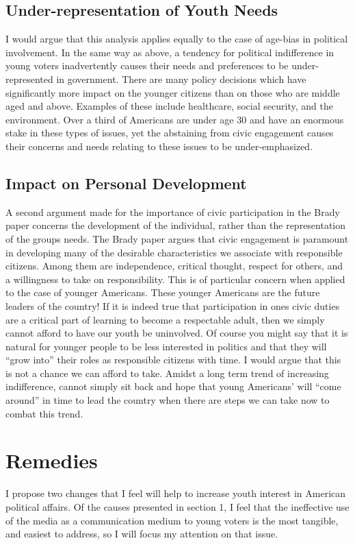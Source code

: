 \documentclass[12pt,letterpaper]{article}
\begin{document}
\subsection{Under-representation of Youth Needs}
I would argue that this analysis applies equally to the case of
age-bias in political involvement.  In the same way as above, a
tendency for political indifference in young voters inadvertently
causes their needs and preferences to be under-represented in
government.  There are many policy decisions which have significantly
more impact on the younger citizens than on those who are middle aged
and above.  Examples of these include healthcare, social security, and
the environment. Over a third of Americans are under age 30 and have
an enormous stake in these types of issues, yet the abstaining from
civic engagement causes their concerns and needs relating to these
issues to be under-emphasized.

\subsection{Impact on Personal Development} A second argument made for
the importance of civic participation in the Brady paper concerns the
development of the individual, rather than the representation of the
groups needs. The Brady paper argues that civic engagement is
paramount in developing many of the desirable characteristics we
associate with responsible citizens.  Among them are independence,
critical thought, respect for others, and a willingness to take
on responsibility. This is of particular concern when applied to the
case of younger Americans. These younger Americans are the future
leaders of the country! If it is indeed true that participation in
ones civic duties are a critical part of learning to become a
respectable adult, then we simply cannot afford to have our youth be
uninvolved.  Of course you might say that it is natural for younger
people to be less interested in politics and that they will ``grow
into'' their roles as responsible citizens with time.  I would argue
that this is not a chance we can afford to take. Amidst a long term
trend of increasing indifference, cannot simply sit back and hope that
young Americans' will ``come around'' in time to lead the country when
there are steps we can take now to combat this trend.





\section{Remedies}
I propose two changes that I feel will help to increase youth
interest in American political affairs.  Of the causes presented in
section 1, I feel that the ineffective use of the media as a
communication medium to young voters is the most tangible, and easiest
to address, so I will focus my attention on that issue.
\end{document}
